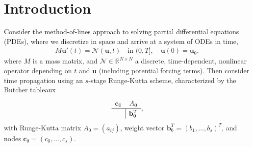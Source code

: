 \documentclass[a4paper,10pt]{article}
\begin{document}
\allowdisplaybreaks

\section{Introduction}

Consider the method-of-lines approach to solving partial differential equations (PDEs),
where we discretize in space and arrive at a system of ODEs in time,
%
\begin{align}\label{eq:problem}
	M\mathbf{u}'(t) =  \mathcal{N}(\mathbf{u},t) \quad\text{in }(0,T], \quad \mathbf{u}(0) = \mathbf{u}_0,
\end{align}
%
where $M$ is a mass matrix, and $\mathcal{N}\in\mathbb{R}^{N\times N}$ a discrete, time-dependent, nonlinear
operator depending on $t$ and $\mathbf{u}$ (including potential forcing terms).
Then consider time propagation using an $s$-stage
Runge-Kutta scheme, characterized by the Butcher tableaux 
%
\begin{align*}
	\renewcommand\arraystretch{1.2}
	\begin{array}
	{c|c}
	\mathbf{c}_0 & A_0\\
	\hline
	& \mathbf{b}_0^T
	\end{array},
\end{align*}
%
with Runge-Kutta matrix $A_0 = (a_{ij})$, weight vector $\mathbf{b}_0^T = (b_1, \ldots, b_s)^T$, and 
nodes $\mathbf{c}_0 = (c_0, \ldots, c_s)$.
\end{document}
